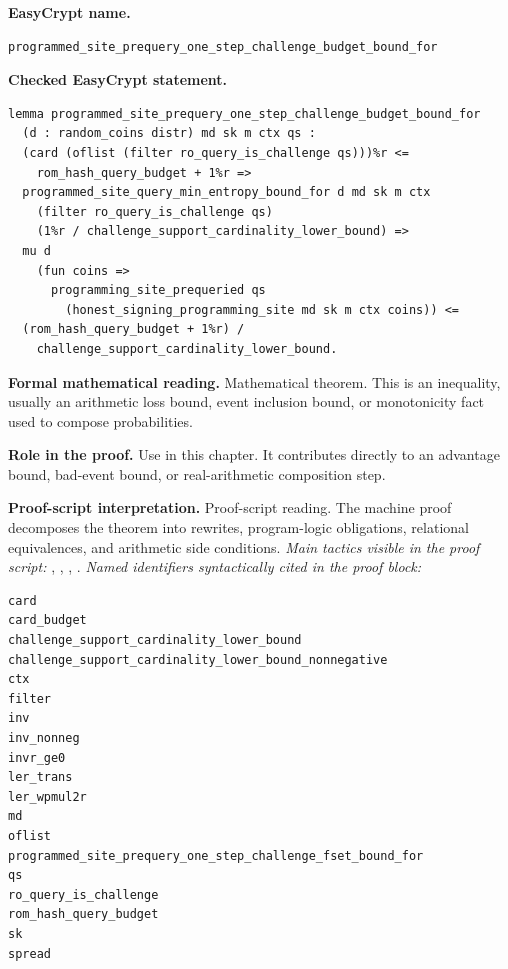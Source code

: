\begin{formaltheorem}
\noindent\textbf{EasyCrypt name.}
\begin{lstlisting}[language=EasyCrypt,basicstyle=\ttfamily\scriptsize]
programmed_site_prequery_one_step_challenge_budget_bound_for
\end{lstlisting}
\noindent\textbf{Checked EasyCrypt statement.}
\begin{lstlisting}[language=EasyCrypt,basicstyle=\ttfamily\scriptsize]
lemma programmed_site_prequery_one_step_challenge_budget_bound_for
  (d : random_coins distr) md sk m ctx qs :
  (card (oflist (filter ro_query_is_challenge qs)))%r <=
    rom_hash_query_budget + 1%r =>
  programmed_site_query_min_entropy_bound_for d md sk m ctx
    (filter ro_query_is_challenge qs)
    (1%r / challenge_support_cardinality_lower_bound) =>
  mu d
    (fun coins =>
      programming_site_prequeried qs
        (honest_signing_programming_site md sk m ctx coins)) <=
  (rom_hash_query_budget + 1%r) /
    challenge_support_cardinality_lower_bound.
\end{lstlisting}
\noindent\textbf{Formal mathematical reading.}
Mathematical theorem. This is an inequality, usually an arithmetic loss bound, event inclusion bound, or monotonicity fact used to compose probabilities.

\noindent\textbf{Role in the proof.}
Use in this chapter. It contributes directly to an advantage bound, bad-event bound, or real-arithmetic composition step.

\noindent\textbf{Proof-script interpretation.}
Proof-script reading. The machine proof decomposes the theorem into rewrites, program-logic obligations, relational equivalences, and arithmetic side conditions.
\emph{Main tactics visible in the proof script:} , , , .
\emph{Named identifiers syntactically cited in the proof block:}
\begin{lstlisting}[language=EasyCrypt,basicstyle=\ttfamily\scriptsize]
card
card_budget
challenge_support_cardinality_lower_bound
challenge_support_cardinality_lower_bound_nonnegative
ctx
filter
inv
inv_nonneg
invr_ge0
ler_trans
ler_wpmul2r
md
oflist
programmed_site_prequery_one_step_challenge_fset_bound_for
qs
ro_query_is_challenge
rom_hash_query_budget
sk
spread
\end{lstlisting}

\end{formaltheorem}

